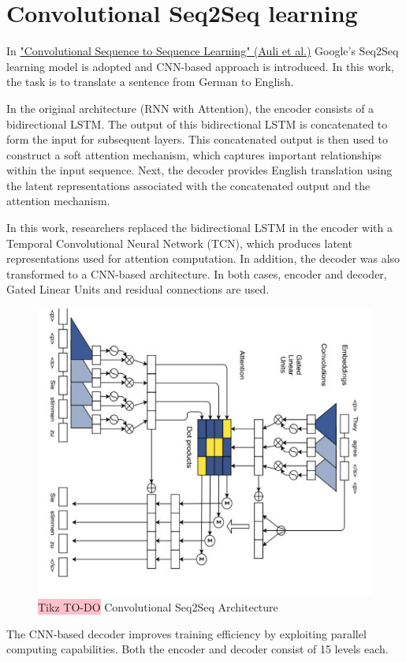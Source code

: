 \section{Convolutional Seq2Seq learning}
In \href{https://arxiv.org/pdf/1705.03122}{"Convolutional Sequence to Sequence Learning" (Auli et al.)} Google's Seq2Seq learning model is adopted and CNN-based approach is introduced. In this work, the task is to translate a sentence from German to English.

In the original architecture (RNN with Attention), the encoder consists of a bidirectional LSTM. The output of this bidirectional LSTM is concatenated to form the input for subsequent layers. This concatenated output is then used to construct a soft attention mechanism, which captures important relationships within the input sequence. Next, the decoder provides English translation using the latent representations associated with the concatenated output and the attention mechanism.

In this work, researchers replaced the bidirectional LSTM in the encoder with a Temporal Convolutional Neural Network (TCN), which produces latent representations used for attention computation. In addition, the decoder was also transformed to a CNN-based architecture. In both cases, encoder and decoder, Gated Linear Units and residual connections are used.

\begin{figure}[!htbp]
    \centering
    \includegraphics[width=0.6\linewidth]{tikz/chapter8 - Convolutional Seq2Seq.png}
    \caption{{\color{red}\colorbox{pink}{Tikz TO-DO}} Convolutional Seq2Seq Architecture}
\end{figure}

The CNN-based decoder improves training efficiency by exploiting parallel computing capabilities. Both the encoder and decoder consist of 15 levels each.

